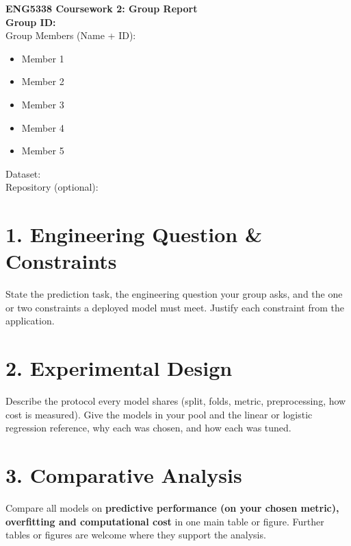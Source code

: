 \documentclass[11pt,a4paper]{article}
\begin{document}
\begin{center}
    {\LARGE \textbf{ENG5338 Coursework 2: Group Report}}\\[0.5em]
    \textbf{Group ID:} \underline{\hspace{3cm}} \\[0.5em]
    Group Members (Name + ID):
    \begin{itemize}
        \item Member 1
        \item Member 2
        \item Member 3
        \item Member 4
        \item Member 5
    \end{itemize}
    Dataset: \underline{\hspace{6cm}} \\[0.5em]
    Repository (optional): \underline{\hspace{6cm}}
\end{center}

\vspace{1em}

\section*{1. Engineering Question \& Constraints}
State the prediction task, the engineering question your group asks, and the one or two constraints a deployed model must meet. Justify each constraint from the application.

\section*{2. Experimental Design}
Describe the protocol every model shares (split, folds, metric, preprocessing, how cost is measured). Give the models in your pool and the linear or logistic regression reference, why each was chosen, and how each was tuned.

\section*{3. Comparative Analysis}
Compare all models on \textbf{predictive performance (on your chosen metric), overfitting and computational cost} in one main table or figure. Further tables or figures are welcome where they support the analysis.
\begin{center}
\end{center}
\end{document}
